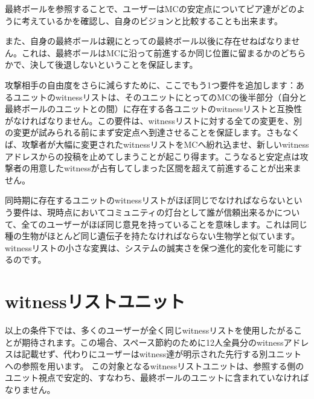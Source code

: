 \documentclass[a4paper, dvipdfmx]{jsarticle}
\begin{document}
最終ボールを参照することで、ユーザーはMCの安定点についてピア達がどのように考えているかを確認し、自身のビジョンと比較することも出来ます。

また、自身の最終ボールは親にとっての最終ボール以後に存在せねばなりません。これは、最終ボールはMCに沿って前進するか同じ位置に留まるかのどちらかで、決して後退しないということを保証します。

攻撃相手の自由度をさらに減らすために、ここでもう1つ要件を追加します：あるユニットのwitnessリストは、そのユニットにとってのMCの後半部分（自分と最終ボールのユニットとの間）に存在する各ユニットのwitnessリストと互換性がなければなりません。この要件は、witnessリストに対する全ての変更を、別の変更が試みられる前にまず安定点へ到達させることを保証します。さもなくば、攻撃者が大幅に変更されたwitnessリストをMCへ紛れ込ませ、新しいwitnessアドレスからの投稿を止めてしまうことが起こり得ます。こうなると安定点は攻撃者の用意したwitnessが占有してしまった区間を超えて前進することが出来ません。

同時期に存在するユニットのwitnessリストがほぼ同じでなければならないという要件は、現時点においてコミュニティの灯台として誰が信頼出来るかについて、全てのユーザーがほぼ同じ意見を持っていることを意味します。これは同じ種の生物がほとんど同じ遺伝子を持たなければならない生物学と似ています。witnessリストの小さな変異は、システムの誠実さを保つ進化的変化を可能にするのです。

\section{witnessリストユニット}
以上の条件下では、多くのユーザーが全く同じwitnessリストを使用したがることが期待されます。この場合、スペース節約のために12人全員分のwitnessアドレスは記載せず、代わりにユーザーはwitness達が明示された先行する別ユニットへの参照を用います。
この対象となるwitnessリストユニットは、参照する側のユニット視点で安定的、すなわち、最終ボールのユニットに含まれていなければなりません。
\end{document}
